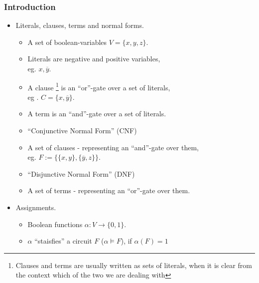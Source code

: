 \documentclass[t,usenames,dvipsnames]{beamer}
\title[space vs. width in resolution]
{Small space in resolution calculus implies small width
\texorpdfstring{\footnote{\tiny Filmus et al., From Small Space to Small Width in Resolution, ACM Trans.
Comput., 2015.}}}
\author{Narek Bojikian} %
\institute[hu-berlin] %
{
Humboldt University of Berlin\\ %
\medskip
\textit{bojikian@informatik.hu-berlin.de} %
}
\date{10.07.2020} %
\begin{document}
\begin{frame}
\titlepage %
\end{frame}
\begin{frame} \frametitle{Introduction}
	\begin{itemize}[<+->]
		\item Literals, clauses, terms and normal forms.
			\begin{itemize}[<+->]
				\item A set of boolean-variables $V = \{x, y, z\}$.
				\item Literals are negative and positive variables,\\
					\hspace{1cm} eg. $x, \overline y$.
				\item A clause
					\footnote{Clauses and terms are usually written as sets of
						literals, when it is clear from the context which of
					the two we are dealing with}
					is an ``or''-gate over a set of literals,\\
					\hspace{1cm} 
					eg . $C = \{x, \overline y\}$.
				\item A term is an ``and''-gate over a set of literals.
				\item ``Conjunctive Normal Form'' (CNF)\\
				\item[]	\hspace{1cm}A set of clauses -
					representing an ``and''-gate over them,\\
					\hspace{1cm} eg. $F := \{ \{x, y\}, \{\overline y, z\}\}$.
				\item ``Disjunctive Normal Form'' (DNF)\\
				\item[]	\hspace{1cm}A set of terms -
					representing an ``or''-gate over them.
			\end{itemize}
		\item Assignments.
			\begin{itemize}
				\item Boolean functions $\alpha: V \rightarrow \{0, 1\}$.
				\item $\alpha$ ``staisfies'' a circuit $F$ ($\alpha \models F$), if
					$\alpha(F) = 1$ 
			\end{itemize}
	\end{itemize}
	
\end{frame}
\end{document}
